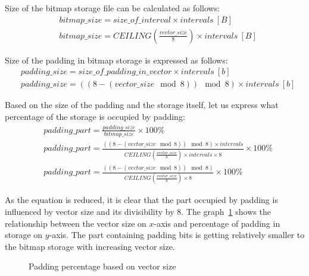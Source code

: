 Size of the bitmap storage file can be calculated as follows:
\begin{align*}\label{equ:bitmap_size}
   &bitmap\_size = size\_of\_interval \times intervals\:[B] \\
   &bitmap\_size = CEILING(\frac{vector\_size}{8}) \times intervals\:[B]
\end{align*}

Size of the padding in bitmap storage is expressed as follows:
\begin{align*}
   &padding\_size = size\_of\_padding\_in\_vector \times intervals\:[b] \\
   &padding\_size = ((8 - (vector\_size\mod 8))\mod 8) \times intervals\:[b]
\end{align*}

Based on the size of the padding and the storage itself, let us express what percentage
of the storage is occupied by padding:
\begin{align*}
   &padding\_part = \frac{padding\_size}{bitmap\_size} \times 100\% \\
   &padding\_part = \frac{((8 - (vector\_size\mod 8))\mod 8) \times intervals}{CEILING(\frac{vector\_size}{8}) \times intervals \times 8} \times 100\% \\
   &padding\_part = \frac{((8 - (vector\_size\mod 8))\mod 8)}{CEILING(\frac{vector\_size}{8}) \times 8} \times 100\%
\end{align*}

As the equation is reduced, it is clear that the part occupied by padding is influenced by vector size and its divisibility by 8. The graph~\ref{fig:padding}
shows the relationship between the vector size on $x$-axis and percentage of padding in storage on $y$-axis. The part
containing padding bits is getting relatively smaller to the bitmap storage with increasing vector size.

\begin{figure}[H]
\begin{center}
       \hfill
      \caption{Padding percentage based on vector size} \label{fig:padding}
\end{center}
\end{figure}

